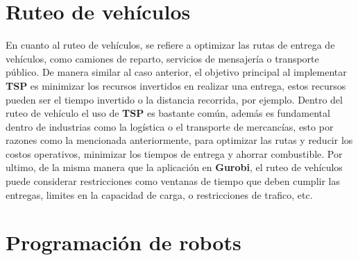         \section{Ruteo de vehículos}
        
            En cuanto al ruteo de vehículos, se refiere a optimizar las rutas de entrega de vehículos, como camiones de reparto, servicios de mensajería o transporte público. De manera similar al caso anterior, el objetivo principal al implementar \textbf{TSP} es minimizar los recursos invertidos en realizar una entrega, estos recursos pueden ser el tiempo invertido o la distancia recorrida, por ejemplo. 
            \newline
            \newline
            Dentro del ruteo de vehículo el uso de \textbf{TSP} es bastante común, además es fundamental dentro de industrias como la logística o el transporte de mercancías, esto por razones como la mencionada anteriormente, para optimizar las rutas y reducir los costos operativos, minimizar los tiempos de entrega y ahorrar combustible.
            \newline
            \newline
            Por ultimo, de la misma manera que la aplicación en \textbf{Gurobi}, el ruteo de vehículos puede considerar restricciones como ventanas de tiempo que deben cumplir las entregas, limites en la capacidad de carga, o restricciones de trafico, etc.
            
        \section{Programación de robots}
        
